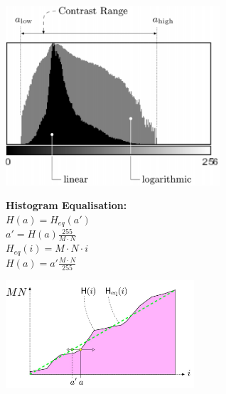 \begin{minipage}{7cm}
  \includegraphics[width=8cm]{./images/contrast.png}

  \textbf{Histogram Equalisation:}\\
  $H(a) = H_{eq}(a')$\\
  $a' = H(a) \frac{255}{M \cdot N}$\\
  $H_{eq}(i) = M \cdot N \cdot i$\\
  $H(a) = a' \frac{M \cdot N}{255} $
  
  \includegraphics[width=7cm]{./images/histogram_equalisation.png}
\end{minipage}